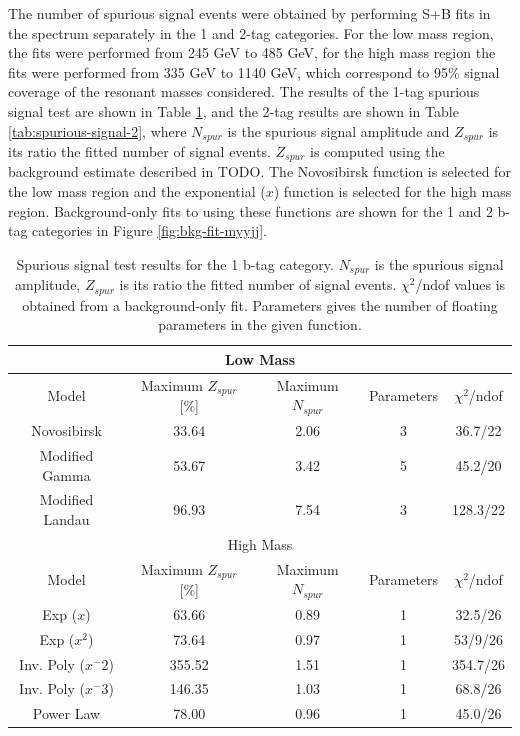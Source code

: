 The number of spurious signal events were obtained by performing S+B fits in the \myybb spectrum separately in the 1 and 2-tag categories. For the low mass region, the fits were performed from 245 GeV to 485 GeV, for the high mass region the fits were performed from 335 GeV to 1140 GeV, which correspond to 95\% signal coverage of the resonant masses considered. The results of the 1-tag spurious signal test are shown in Table \ref{tab:spurious-signal-1}, and the 2-tag results are shown in Table \ref{tab:spurious-signal-2}, where  $N_{spur}$ is the spurious signal amplitude and $Z_{spur}$ is its ratio the fitted number of signal events. $Z_{spur}$ is computed using the background estimate described in TODO. The Novosibirsk function is selected for the low mass region and the exponential ($x$) function is selected for the high mass region. Background-only fits to using these functions are shown for the 1 and 2 b-tag categories in Figure \ref{fig:bkg-fit-myyjj}.
\begin{table}
  \centering
  \caption[Spurious signal test results for the 1 b-tag category]{Spurious signal test results for the 1 b-tag category. $N_{spur}$ is the spurious signal amplitude, $Z_{spur}$ is its ratio the fitted number of signal events. $\chi^2$/ndof values is obtained from a background-only fit. Parameters gives the number of floating parameters in the given function.}
  \label{tab:spurious-signal-1}
  \begin{tabular}{|c|c|c|c|c|}
    \hline
    \multicolumn{5}{|c|}{Low Mass}\\
    \hline
    Model     &   Maximum $Z_{spur}$ [\%]      &      Maximum $N_{spur}$      &   Parameters     &    $\chi^2$/ndof \\
    \hline
    Novosibirsk        & 33.64    &   2.06  & 3  & 36.7/22 \\
    Modified Gamma     & 53.67    &   3.42  & 5  & 45.2/20 \\
    Modified Landau    & 96.93    &   7.54  & 3  & 128.3/22 \\
    \hline
    \multicolumn{5}{|c|}{High Mass}\\
    \hline
    Model     &   Maximum $Z_{spur}$ [\%]      &      Maximum $N_{spur}$      &   Parameters     &    $\chi^2$/ndof \\
    \hline
    Exp ($x$)             &  63.66    &  0.89  & 1  & 32.5/26 \\
    Exp ($x^2$)           &  73.64    &  0.97  & 1  & 53/9/26 \\
    Inv. Poly ($x^-2$)    &  355.52   &  1.51  & 1  & 354.7/26 \\
    Inv. Poly ($x^-3$)    &  146.35   &  1.03  & 1  & 68.8/26 \\
    Power Law             &  78.00    &  0.96  & 1  & 45.0/26 \\
    \hline    
  \end{tabular}
\end{table}

